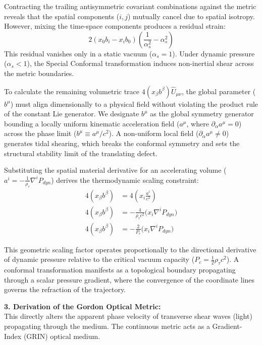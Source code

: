 Contracting the trailing antisymmetric covariant combinations against the metric reveals that the spatial components ($i, j$) mutually cancel due to spatial isotropy. However, mixing the time-space components produces a residual strain: 
\begin{equation}
    2(x_0 b_i - x_i b_0) \left( \frac{1}{\alpha_s^2} - \alpha_s^2 \right) %
\end{equation}
This residual vanishes only in a static vacuum ($\alpha_s = 1$). Under dynamic pressure ($\alpha_s < 1$), the Special Conformal transformation induces non-inertial shear across the metric boundaries.

To calculate the remaining volumetric trace $4(x_\beta b^\beta)\hat{U}_{\mu\nu}$, the global parameter ($b^\mu$) must align dimensionally to a physical field without violating the product rule of the constant Lie generator. We designate $b^\mu$ as the global symmetry generator bounding a locally uniform kinematic acceleration field ($a^\mu$, where $\partial_\alpha a^\mu = 0$) across the phase limit ($b^\mu \equiv a^\mu / c^2$). A non-uniform local field ($\partial_\alpha a^\mu \neq 0$) generates tidal shearing, which breaks the conformal symmetry and sets the structural stability limit of the translating defect.

Substituting the spatial material derivative for an accelerating volume ($a^i = - \frac{1}{\rho_\tau} \nabla^i P_{dyn}$) derives the thermodynamic scaling constraint:
\begin{align}
    4(x_\beta b^\beta) &= 4 \left( x_i \frac{a^i}{c^2} \right) \nonumber \\
    4(x_\beta b^\beta) &= -\frac{4}{\rho_\tau c^2} \big( x_i \nabla^i P_{dyn} \big) \nonumber \\
    4(x_\beta b^\beta) &= -\frac{2}{P_c} \big( x_i \nabla^i P_{dyn} \big) \label{eq:conformal_pressure_coupling}
\end{align}

This geometric scaling factor operates proportionally to the directional derivative of dynamic pressure relative to the critical vacuum capacity ($P_c = \frac{1}{2}\rho_\tau c^2$). A conformal transformation manifests as a topological boundary propagating through a scalar pressure gradient, where the convergence of the coordinate lines governs the refraction of the trajectory.

\vspace{0.2 cm}

\textbf{3. Derivation of the Gordon Optical Metric:} \\
This directly alters the apparent phase velocity of transverse shear waves (light) propagating through the medium. The continuous metric acts as a Gradient-Index (GRIN) optical medium.

